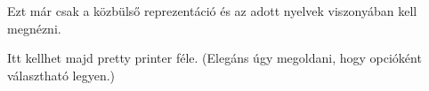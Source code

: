 
Ezt már csak a közbülső reprezentáció és az adott nyelvek viszonyában kell megnézni.

Itt kellhet majd pretty printer féle. (Elegáns úgy megoldani, hogy opcióként választható legyen.)
